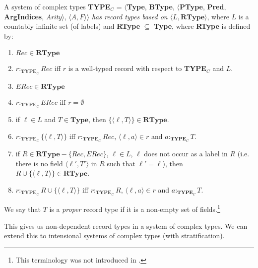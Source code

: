 A system of complex types \textbf{TYPE}$_C$ = $\langle${\bf Type}, {\bf BType},
$\langle$\textbf{PType}, {\bf Pred}, \textbf{ArgIndices}, {\it
  Arity\/}$\rangle$, $\langle A,F\rangle$$\rangle$ \textit{has record
  types based on $\langle L, \mathbf{RType}\rangle$}, where $L$ is a countably infinite set (of labels)
and \textbf{RType} $\subseteq$ \textbf{Type}, where \textbf{RType} is
defined by:
\begin{enumerate} 
 
\item $\mathit{Rec}\in\mathbf{RType}$

\item $r:_{\mathbf{TYPE}_C}\mathit{Rec}$ iff $r$ is a well-typed record with
  respect to \textbf{TYPE$_C$} and $L$.

\item $\mathit{ERec}\in\mathbf{RType}$

\item $r:_{\mathbf{TYPE}_C}\mathit{ERec}$ iff $r=\emptyset$

\item if $\ell\in L$ and $T\in\mathbf{Type}$, then
  $\{\langle\ell,T\rangle\}\in\mathbf{RType}$.

\item $r:_{\mathbf{TYPE}_C}\{\langle\ell,T\rangle\}$ iff
  $r:_{\mathbf{TYPE}_C}\mathit{Rec}$, $\langle\ell,a\rangle\in r$ and
  $a:_{\mathbf{TYPE}_C}T$.

\item if $R\in\mathbf{RType}-\{\mathit{Rec},\mathit{ERec}\}$, $\ell\in L$, $\ell$ does not occur as a
  label in $R$ (i.e. there is no field $\langle\ell',T'\rangle$ in $R$
  such that $\ell'=\ell$), then
  $R\cup\{\langle\ell,T\rangle\}\in\mathbf{RType}$.

\item $r:_{\mathbf{TYPE}_C}R\cup\{\langle\ell,T\rangle\}$ iff
  $r:_{\mathbf{TYPE}_C}R$, $\langle\ell,a\rangle\in r$ and $a:_{\mathbf{TYPE}_C}T$.
 
\end{enumerate}

We say that $T$ is a \textit{proper} record type if it is a non-empty
set of fields.\footnote{This terminology was not introduced in \cite{Cooper2012}.}\label{pg:proprectype} 

This gives us non-dependent record types in a system of complex types.
We can extend this to intensional systems of complex types (with
stratification).  


